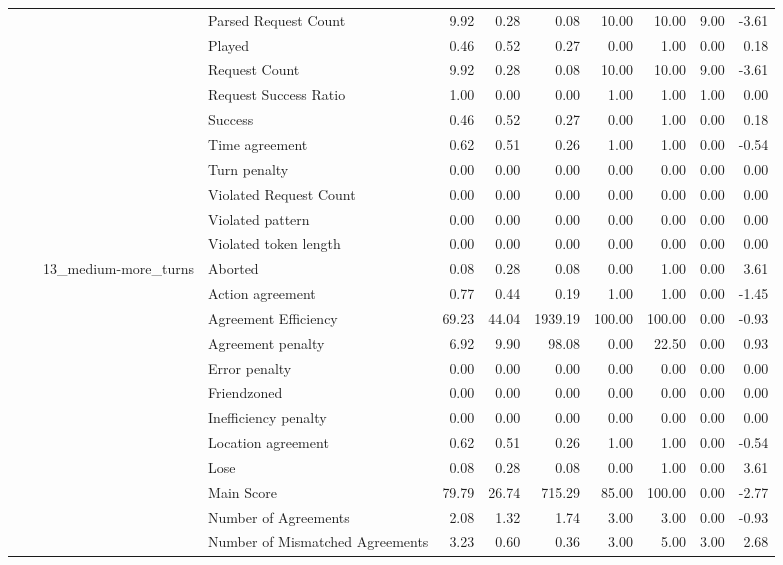 \begin{tabular}{llllrrrrrrr}
 &  &  & Parsed Request Count & 9.92 & 0.28 & 0.08 & 10.00 & 10.00 & 9.00 & -3.61 \\
 &  &  & Played & 0.46 & 0.52 & 0.27 & 0.00 & 1.00 & 0.00 & 0.18 \\
 &  &  & Request Count & 9.92 & 0.28 & 0.08 & 10.00 & 10.00 & 9.00 & -3.61 \\
 &  &  & Request Success Ratio & 1.00 & 0.00 & 0.00 & 1.00 & 1.00 & 1.00 & 0.00 \\
 &  &  & Success & 0.46 & 0.52 & 0.27 & 0.00 & 1.00 & 0.00 & 0.18 \\
 &  &  & Time agreement & 0.62 & 0.51 & 0.26 & 1.00 & 1.00 & 0.00 & -0.54 \\
 &  &  & Turn penalty & 0.00 & 0.00 & 0.00 & 0.00 & 0.00 & 0.00 & 0.00 \\
 &  &  & Violated Request Count & 0.00 & 0.00 & 0.00 & 0.00 & 0.00 & 0.00 & 0.00 \\
 &  &  & Violated pattern & 0.00 & 0.00 & 0.00 & 0.00 & 0.00 & 0.00 & 0.00 \\
 &  &  & Violated token length & 0.00 & 0.00 & 0.00 & 0.00 & 0.00 & 0.00 & 0.00 \\
\cline{3-11}
 &  & \multirow[t]{27}{*}{13_medium-more_turns} & Aborted & 0.08 & 0.28 & 0.08 & 0.00 & 1.00 & 0.00 & 3.61 \\
 &  &  & Action agreement & 0.77 & 0.44 & 0.19 & 1.00 & 1.00 & 0.00 & -1.45 \\
 &  &  & Agreement Efficiency & 69.23 & 44.04 & 1939.19 & 100.00 & 100.00 & 0.00 & -0.93 \\
 &  &  & Agreement penalty & 6.92 & 9.90 & 98.08 & 0.00 & 22.50 & 0.00 & 0.93 \\
 &  &  & Error penalty & 0.00 & 0.00 & 0.00 & 0.00 & 0.00 & 0.00 & 0.00 \\
 &  &  & Friendzoned & 0.00 & 0.00 & 0.00 & 0.00 & 0.00 & 0.00 & 0.00 \\
 &  &  & Inefficiency penalty & 0.00 & 0.00 & 0.00 & 0.00 & 0.00 & 0.00 & 0.00 \\
 &  &  & Location agreement & 0.62 & 0.51 & 0.26 & 1.00 & 1.00 & 0.00 & -0.54 \\
 &  &  & Lose & 0.08 & 0.28 & 0.08 & 0.00 & 1.00 & 0.00 & 3.61 \\
 &  &  & Main Score & 79.79 & 26.74 & 715.29 & 85.00 & 100.00 & 0.00 & -2.77 \\
 &  &  & Number of Agreements & 2.08 & 1.32 & 1.74 & 3.00 & 3.00 & 0.00 & -0.93 \\
 &  &  & Number of Mismatched Agreements & 3.23 & 0.60 & 0.36 & 3.00 & 5.00 & 3.00 & 2.68 \\

\end{tabular}
